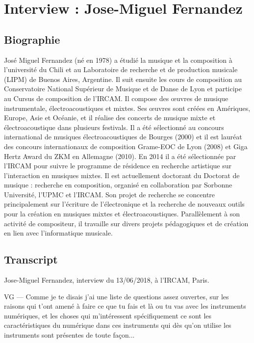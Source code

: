 \chapter{Interview : Jose-Miguel Fernandez}
\label{appendix:fernandez}

\section*{Biographie}

\noindent José Miguel Fernandez (né en 1978) a étudié la musique et la composition à l’université du Chili et au Laboratoire de recherche et de production musicale (LIPM) de Buenos Aires, Argentine. Il suit ensuite les cours de composition au Conservatoire National Supérieur de Musique et de Danse de Lyon et participe au Cursus de composition de l’IRCAM. Il compose des œuvres de musique instrumentale, électroacoustiques et mixtes. Ses œuvres sont créées en Amériques, Europe, Asie et Océanie, et il réalise des concerts de musique mixte et électroacoustique dans plusieurs festivals. Il a été sélectionné au concours international de musiques électroacoustiques de Bourges (2000) et il est lauréat des concours internationaux de composition Grame-EOC de Lyon (2008) et Giga Hertz Award du ZKM en Allemagne (2010). En 2014 il a été sélectionnée par l'IRCAM pour suivre le programme de résidence en recherche artistique sur l'interaction en musiques mixtes. Il est actuellement doctorant du Doctorat de musique : recherche en composition, organisé en collaboration par Sorbonne Université, l’UPMC et l'IRCAM. Son projet de recherche se concentre principalement sur l’écriture de l’électronique et la recherche de nouveaux outils pour la création en musiques mixtes et électroacoustiques. Parallèlement à son activité de compositeur, il travaille sur divers projets pédagogiques et de création en lien avec l’informatique musicale.

\section*{Transcript}

\noindent Jose-Miguel Fernandez, interview du 13/06/2018, à l'IRCAM, Paris.

VG — Comme je te disais j'ai une liste de questions assez ouvertes, sur les raisons qui t'ont amené à faire ce que tu fais et là ou tu vas avec les instruments numériques, et les choses qui m'intéressent spécifiquement ce sont les caractéristiques du numérique dans ces instruments qui dès qu'on utilise les instruments sont présentes de toute façon... 

